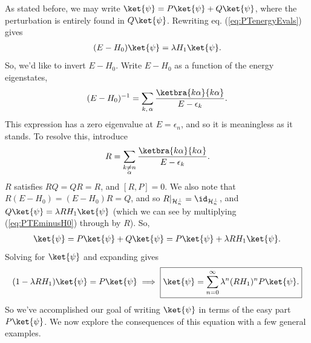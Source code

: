 \documentclass[11pt]{article}
\begin{document}
As stated before, we may write $\ket{\psi} = P\ket{\psi} + Q\ket{\psi}$,
where the perturbation is entirely found in $Q\ket{\psi}$. Rewriting eq. 
(\ref{eq:PTenergyEvals}) gives
\begin{align}
    \label{eq:PTEminusH0}
    (E - H_0)\ket{\psi} = \lambda H_1 \ket{\psi}.
\end{align}
So, we'd like to invert $E - H_0$. Write $E - H_0$ as a
function of the energy eigenstates,
\begin{align*}
    (E - H_0)^{-1} = \sum_{k, \, \alpha} \frac{\ketbra{k\alpha}{k\alpha}}{E - \epsilon_k}.
\end{align*}
This expression has a zero eigenvalue at $E = \epsilon_n$, and so it
is meaningless as it stands. To resolve this, introduce
\begin{align*}
    R = \sum_{\substack{k \neq n\\ \alpha}} \frac{\ketbra{k\alpha}{k\alpha}}{E - \epsilon_k}.
\end{align*}
$R$ satisfies $RQ = QR = R$, and $[R, P] = 0$. We also note that $R (E - H_0) = (E - H_0)R = Q$,
and so $R|_{\mathcal{H}_n^\perp} = \id_{\mathcal{H}_n^\perp}$, and $Q\ket{\psi} = \lambda R H_1 \ket{\psi}$
(which we can see by multiplying (\ref{eq:PTEminusH0}) through by $R$). So,
\begin{align*}
    \ket{\psi} = P \ket{\psi} + Q \ket{\psi} = P \ket{\psi} + \lambda R H_1 \ket{\psi}.
\end{align*}
Solving for $\ket{\psi}$ and expanding gives
\begin{align}
    \label{eq:PTstate}
    (1 - \lambda R H_1) \ket{\psi} = P \ket{\psi} \implies \boxed{\ket{\psi} = \sum_{n = 0}^\infty \lambda^n (RH_1)^n P \ket{\psi}.}
\end{align}
So we've accomplished our goal of writing $\ket{\psi}$ in
terms of the easy part $P\ket{\psi}$. We now explore the consequences
of this equation with a few general examples.
\end{document}
